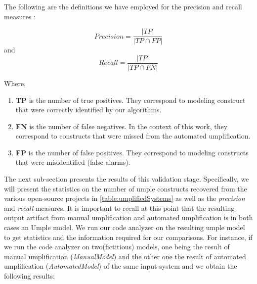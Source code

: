 The following are the definitions we have employed for the precision and recall measures \cite{precisionRecallDef}:




\[  Precision=\frac{|TP|}{|TP \cap FP|}\]
and \\
\[  Recall=\frac{|TP|}{|TP \cap FN|}\]

Where,
\begin{enumerate}
\label{sec:tuning}
\item \textbf{TP} is the number of true positives. They correspond to modeling construct that were correctly identified by our algorithms. 
\item \textbf{FN} is the number of false negatives.  In the context of this work, they correspond to constructs that were missed from the automated umplification. 
\item \textbf{FP} is the number of false positives. They correspond to modeling constructs that were misidentified (false alarms). 
\end{enumerate}

The next sub-section presents the results of this validation stage. Specifically, we will present the statistics on the number of umple constructs recovered from the various open-source projects in \ref{table:umplifiedSystems} as well as the \textit{precision} and \textit{recall} measures. It is important to recall at this point that the resulting output artifact from manual umplification and automated umplification is in both cases an Umple model. We run our code analyzer on the resulting umple model to get statistics and the information required for our comparisons. For instance, if we run the code analyzer on two(fictitious) models, one being the result of manual umplification (\textit{ManualModel}) and the other one the result of automated umplification (\textit{AutomatedModel}) of the same input system and we obtain the following results:

